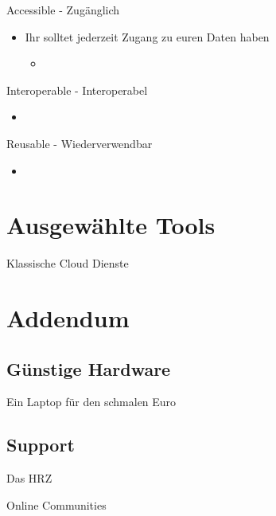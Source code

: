 \documentclass{beamer}
\begin{document}
\begin{frame}{Accessible - Zugänglich}
    \begin{itemize}
        \item Ihr solltet jederzeit Zugang zu euren Daten haben
        \begin{itemize}
            \item 
        \end{itemize}
        
    \end{itemize}
\end{frame}

\begin{frame}{Interoperable - Interoperabel}
    \begin{itemize}
        \item
    \end{itemize}
\end{frame}

\begin{frame}{Reusable - Wiederverwendbar}
    \begin{itemize}
        \item
    \end{itemize}
\end{frame}
\section{Ausgewählte Tools}
\begin{frame}{Klassische Cloud Dienste}
    
\end{frame}

\section{Addendum}
\subsection{Günstige Hardware}
\begin{frame}{Ein Laptop für den schmalen Euro}
    
\end{frame}
\subsection{Support}
\begin{frame}{Das HRZ}
    
\end{frame}
\begin{frame}{Online Communities}
    
\end{frame}
\end{document}
